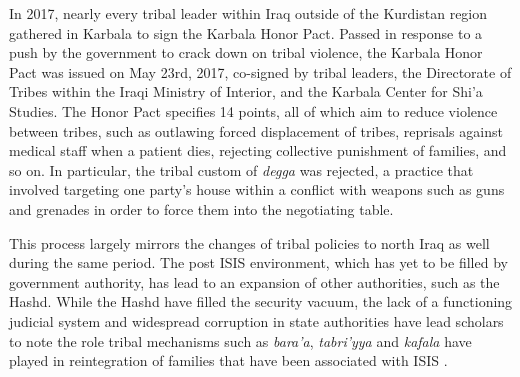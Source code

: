 





In 2017, nearly every tribal leader within Iraq outside of the Kurdistan region gathered in Karbala to sign the Karbala Honor Pact. Passed in response to a push by the government to crack down on tribal violence, the Karbala Honor Pact was issued on May 23rd, 2017, co-signed by tribal leaders, the Directorate of Tribes within the Iraqi Ministry of Interior, and the Karbala Center for Shi'a Studies. The Honor Pact specifies 14 points, all of which aim to reduce violence between tribes, such as outlawing forced displacement of tribes, reprisals against medical staff when a patient dies, rejecting collective punishment of families, and so on. In particular, the tribal custom of \emph{degga} was rejected, a practice that involved targeting one party's house within a conflict with weapons such as guns and grenades in order to force them into the negotiating table. 

This process largely mirrors the changes of tribal policies to north Iraq as well during the same period. The post ISIS environment, which has yet to be filled by government authority, has lead to an expansion of other authorities, such as the Hashd. While the Hashd have filled the security vacuum, the lack of a functioning judicial system and widespread corruption in state authorities have lead scholars to note the role tribal mechanisms such as \emph{bara'a}, \emph{tabri'yya} and \emph{kafala} have played in reintegration of families that have been associated with ISIS \cite{genat_state_nodate}.

